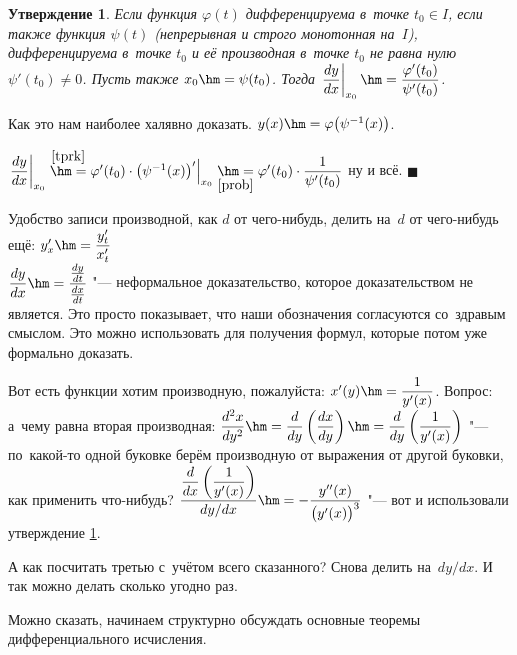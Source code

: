 \documentclass[a4paper,10pt,twoside]{article}
\newtheorem{Ut}{Утверждение}[section]
\newenvironment{Proof}
       {\par\noindent{\textbf{Доказательство.}}}
       {\hfill$\scriptstyle\blacksquare$}
\begin{document}
\begin{Ut}\label{param}
    Если функция $\varphi(t)$ дифференцируема в~точке $t_0\in I$, если также функция $\psi(t)$ (непрерывная и строго монотонная на~$I$), дифференцируема в~точке $t_0$ и её производная в~точке $t_0$ не равна нулю $\psi'(t_0)\neq0$. Пусть также $x_0\hm=\psi(t_0)$. Тогда
    $\left.\dfrac{dy}{dx}\right|_{x_0}\hm=\dfrac{\varphi'(t_0)}{\psi'(t_0)}$.
\end{Ut}

\begin{Proof}
    Как это нам наиболее халявно доказать. $y(x)\hm=\varphi\big(\psi^{-1}(x)\big)$.

    $\left.\dfrac{dy}{dx}\right|_{x_0}\overset{\ref{tprk}}{\hm=}\varphi'(t_0)\cdot\big(\psi^{-1}(x)\big)'\Big|_{x_0}\underset{\ref{prob}}{\hm=}\varphi'(t_0)\cdot\dfrac{1}{\psi'(t_0)}$ ну и всё.
\end{Proof}

Удобство записи производной, как $d$ от чего-нибудь, делить на~$d$ от чего-нибудь ещё: $y'_x\hm=\dfrac{y'_t}{x'_t}$\\$\dfrac
{dy}{dx}\hm=\dfrac{\frac{dy}{dt}}{\frac{dx}{dt}}$ "--- неформальное доказательство, которое доказательством не является. Это просто показывает, что наши
обозначения согласуются со~здравым смыслом. Это можно использовать для получения формул, которые потом уже формально доказать.

Вот есть функции \pau хотим производную, пожалуйста: $x'(y)\hm=\dfrac1{y'(x)}$. Вопрос: а~чему равна вторая производная:
$\dfrac{d^2x}{dy^2}\hm=\dfrac{d}{dy}\left(\dfrac{dx}{dy}\right)\hm=\dfrac{d}{dy}\left(\dfrac1{y'(x)}\right)$ "--- по~какой-то одной буковке берём
производную от выражения от другой буковки, как применить что-нибудь?
$\dfrac{\dfrac{d}{dx}\left(\dfrac{1}{y'(x)}\right)}{dy/dx}\hm=-\dfrac{y''(x)}{\big(y'(x)\big)^3}$ "--- вот и
использовали утверждение \ref{param}.

А как посчитать третью с~учётом всего сказанного? Снова делить на~$dy/dx$. И так можно делать сколько угодно раз.

Можно сказать, начинаем структурно обсуждать основные теоремы дифференциального исчисления.
\end{document}
